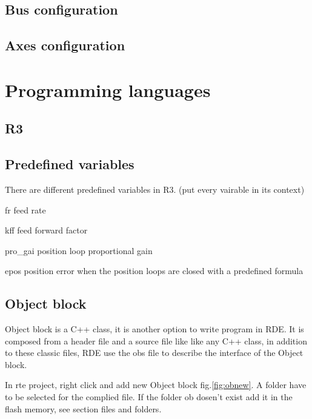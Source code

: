 %	
\subsection{Bus configuration}

%	
\subsection{Axes configuration}

%	 
\section{Programming languages}

%	
\subsection{R3}

%	
\subsection{Predefined variables}
There are different predefined variables in R3. (put every vairable in its context)

fr feed rate

kff feed forward factor

pro\_gai  position loop proportional gain

epos position error when the position loops are closed with a predefined formula


%	
\subsection{Object block}
Object block is a C++ class, it is another option to write program in RDE. It is composed from a header file and a source file like like any C++ class, in addition to these classic files, RDE use the obs file to describe the interface of the Object block.

In rte project, right click and add new Object block fig.\ref{fig:obnew}. A folder have to be selected for the complied file. If the folder ob dosen't exist add it in the flash memory, see section files and folders.

